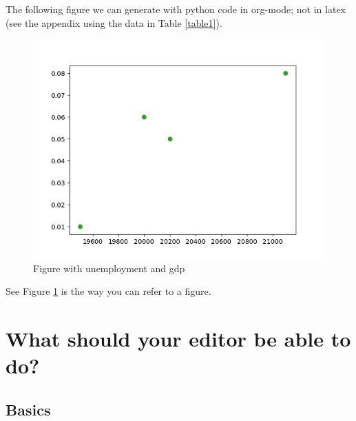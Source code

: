 \documentclass[11pt]{article}
\begin{document}
The following figure we can generate with python code in org-mode; not in latex (see the appendix using the data in Table \ref{table1}).

\begin{figure}[htbp]
\centering
\includegraphics[width=.9\linewidth]{./fig.png}
\caption{\label{figure1} Figure with unemployment and gdp}
\end{figure}

See Figure \ref{figure1} is the way you can refer to a figure.

\section{What should your editor be able to do?}



\subsection{Basics}
\end{document}
